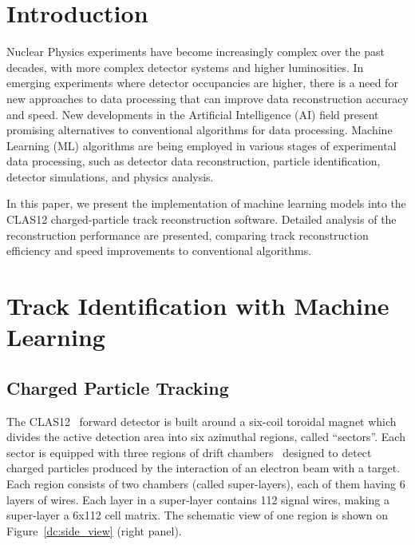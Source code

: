 \documentclass{webofc}
\begin{document}
\section{Introduction}
\label{intro}
Nuclear Physics experiments have become increasingly complex over the past decades, with more complex detector systems and higher luminosities. In emerging experiments where detector occupancies are higher, there is a need for new approaches to data processing that can improve data reconstruction accuracy and speed. New developments in the Artificial Intelligence (AI) field present promising alternatives to conventional algorithms for data processing. Machine Learning (ML) algorithms are being employed in various stages of experimental data processing, such as detector data reconstruction, particle identification, detector simulations, and physics analysis. 

In this paper, we present the implementation of machine learning models into the CLAS12 charged-particle track reconstruction software. Detailed analysis 
of the reconstruction performance are presented, comparing track reconstruction efficiency and speed improvements to conventional algorithms.

\section{Track Identification with Machine Learning}
\label{track-identification}

\subsection{Charged Particle Tracking}
\label{track-identification-ch-particle-tracking}

The CLAS12~\cite{Burkert:2020akg} forward detector is built around a six-coil toroidal magnet 
which divides the active detection area into six azimuthal regions, called ``sectors''. Each sector is 
equipped with three regions of drift chambers~\cite{Mestayer:2020saf} designed to detect charged 
particles produced by the interaction of an electron beam with a target. Each region consists of two 
chambers (called super-layers), each of them having 6 layers of wires. Each layer  in a super-layer 
contains 112 signal wires, making a super-layer a 6x112 cell matrix. The schematic view of one region 
is shown on Figure~\ref{dc:side_view} (right panel).
\end{document}
